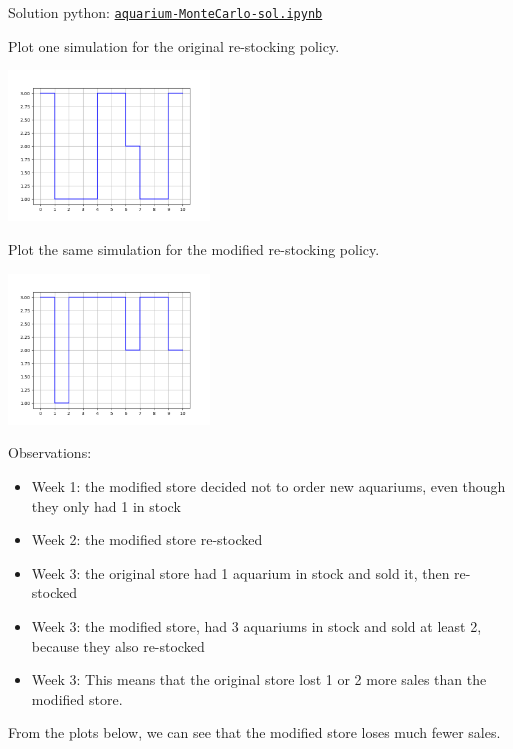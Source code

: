\begin{solution}
\begin{slide}
Solution python: \href{https://utoronto.syzygy.ca/jupyter/user-redirect/git-pull?repo=https://github.com/bigfatbernie/IBLMathModeling&subPath=book/python/aquarium-MonteCarlo-sol.ipynb}{\tt aquarium-MonteCarlo-sol.ipynb}

\begin{parts}	
	\item Plot one simulation for the original re-stocking policy.
	
		\includegraphics[width=0.4\textwidth]{images/aquarium-sim-og.png}
	\item Plot the same simulation for the modified re-stocking policy.
	
		\includegraphics[width=0.4\textwidth]{images/aquarium-sim-mod.png}
		
		
	Observations:
	\begin{itemize}
		\item Week 1: the modified store decided not to order new aquariums, even though they only had 1 in stock
		\item Week 2: the modified store re-stocked
		\item Week 3: the original store had 1 aquarium in stock and sold it, then re-stocked
		\item Week 3: the modified store, had 3 aquariums in stock and sold at least 2, because they also re-stocked
		\item Week 3: This means that the original store lost 1 or 2 more sales than the modified store.
	\end{itemize}	
	
	
	\item From the plots below, we can see that the modified store loses much fewer sales.
\end{parts}	


\end{slide}
\end{solution}

